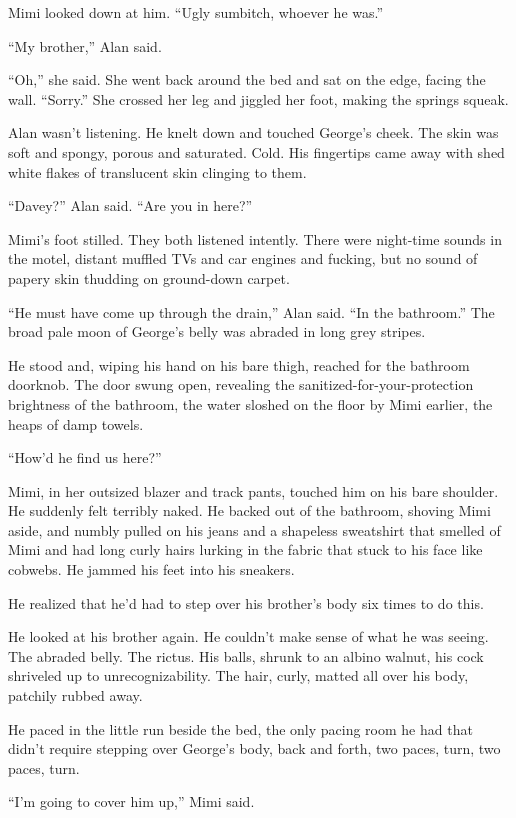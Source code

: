 Mimi looked down at him.  ``Ugly sumbitch, whoever he was.''

``My brother,'' Alan said.

``Oh,'' she said.  She went back around the bed and sat on the edge,
facing the wall.  ``Sorry.'' She crossed her leg and jiggled her foot,
making the springs squeak.

Alan wasn't listening.  He knelt down and touched George's cheek.  The
skin was soft and spongy, porous and saturated.  Cold.  His fingertips
came away with shed white flakes of translucent skin clinging to them.

``Davey?'' Alan said.  ``Are you in here?''

Mimi's foot stilled.  They both listened intently.  There were
night-time sounds in the motel, distant muffled TVs and car engines
and fucking, but no sound of papery skin thudding on ground-down
carpet.

``He must have come up through the drain,'' Alan said.  ``In the
bathroom.'' The broad pale moon of George's belly was abraded in long
grey stripes.

He stood and, wiping his hand on his bare thigh, reached for the
bathroom doorknob.  The door swung open, revealing the
sanitized-for-your-protection brightness of the bathroom, the water
sloshed on the floor by Mimi earlier, the heaps of damp towels.

``How'd he find us here?''

Mimi, in her outsized blazer and track pants, touched him on his bare
shoulder.  He suddenly felt terribly naked.  He backed out of the
bathroom, shoving Mimi aside, and numbly pulled on his jeans and a
shapeless sweatshirt that smelled of Mimi and had long curly hairs
lurking in the fabric that stuck to his face like cobwebs.  He jammed
his feet into his sneakers.

He realized that he'd had to step over his brother's body six times to
do this.

He looked at his brother again.  He couldn't make sense of what he was
seeing.  The abraded belly.  The rictus.  His balls, shrunk to an
albino walnut, his cock shriveled up to unrecognizability.  The hair,
curly, matted all over his body, patchily rubbed away.

He paced in the little run beside the bed, the only pacing room he had
that didn't require stepping over George's body, back and forth, two
paces, turn, two paces, turn.

``I'm going to cover him up,'' Mimi said.

